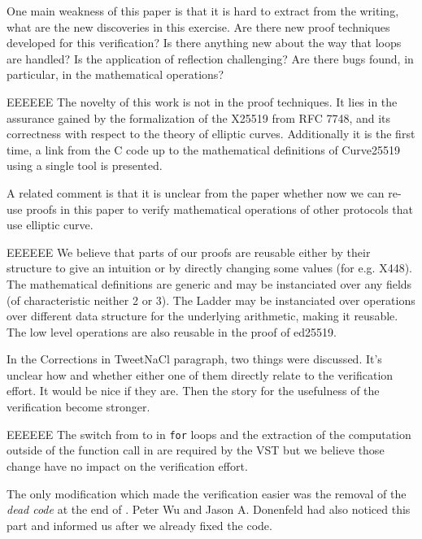 One main weakness of this paper is that it is hard to extract
from the writing, what are the new discoveries in this
exercise. Are there new proof techniques developed for this
verification? Is there anything new about the way that loops
are handled? Is the application of reflection challenging? Are
there bugs found, in particular, in the mathematical operations?

\begin{answer}{EEEEEE}
The novelty of this work is not in the proof techniques. It
lies in the assurance gained by the formalization of the
X25519 from RFC 7748, and its correctness with respect to
the theory of elliptic curves. Additionally it is the first
time, a link from the C code up to the mathematical definitions of
Curve25519 using a single tool is presented.
\end{answer}

A related comment is that it is unclear from the paper
whether now we can re-use proofs in this paper to verify
mathematical operations of other protocols that use elliptic
curve.

\begin{answer}{EEEEEE}
We believe that parts of our proofs are reusable either by
their structure to give an intuition or by directly changing
some values (for e.g. X448). The mathematical definitions
are generic and may be instanciated over any fields (of characteristic
neither 2 or 3). The Ladder may be instanciated
over operations over different data structure for the underlying
arithmetic, making it reusable. The low level operations
\eg {} are also reusable in the proof of ed25519.
\end{answer}

In the Corrections in TweetNaCl paragraph, two things
were discussed. It’s unclear how and whether either one of
them directly relate to the verification effort. It would be nice
if they are. Then the story for the usefulness of the verification
become stronger.

\begin{answer}{EEEEEE}
The switch from  to  in \texttt{for} loops and the
extraction of the computation outside of the function call in
 are required by the VST but we believe those
change have no impact on the verification effort.

The only modification which made the verification easier
was the removal of the \textit{dead code} at the end of
. Peter Wu and Jason A.
Donenfeld had also noticed this part and informed us after we
already fixed the code.
\end{answer}

